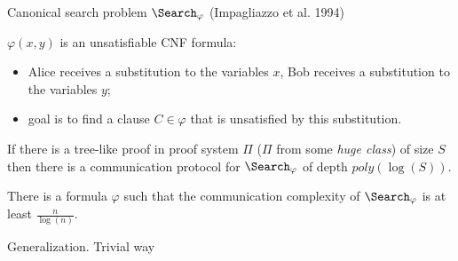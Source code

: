 \begin{frame}{Canonical search problem $\Search_{\varphi}$ (Impagliazzo et al. 1994)}
    
    $\varphi(x, y)$ is an unsatisfiable CNF formula:
    \begin{itemize}
        \item Alice receives a substitution to the variables $x$, Bob receives a substitution to the
            variables $y$;
        \item goal is to find a clause $C \in \varphi$ that is unsatisfied by this substitution.
    \end{itemize}

    \pause

    \begin{theorem}
        If there is a {\color{blue} tree-like} proof in proof system $\Pi$ ($\Pi$ from some \textit{huge
          class}) of size $S$ then there is a communication protocol for $\Search_{\varphi}$ of depth
        $poly(\log(S))$.
    \end{theorem}

    \pause
    
    \begin{theorem}[Pitassi, G{\"{o}}{\"{o}}s, 2014]
        There is a formula $\varphi$ such that the communication complexity of $\Search_{\varphi}$ is at least
        $\frac{n}{\log(n)}$.
    \end{theorem}
\end{frame}

\begin{frame}{Generalization. Trivial way}

	\pause
    \begin{columns}[t]
		\begin{column}{0.6\textwidth}
            
            \vspace{0.3cm}

        \end{column}
        
		\begin{column}{0.25\textwidth}
            
		\end{column}
	\end{columns}

\end{frame}

